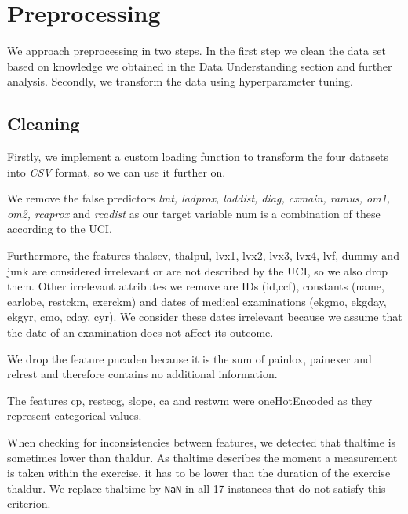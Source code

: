 \newpage
\section{Preprocessing} \label{sec:preprocessing}

We approach preprocessing in two steps. In the first step we clean the data set based on knowledge we obtained in the  Data Understanding section and further analysis. 
Secondly, we transform the data using hyperparameter tuning.

\subsection{Cleaning}
Firstly, we implement a custom loading function to transform the four datasets into \emph{CSV} format, so we can use it further on.

We remove the false predictors \emph{lmt, ladprox, laddist, diag, cxmain, ramus, om1, om2, rcaprox} and \emph{rcadist}  as our target variable num is a combination of these according to the UCI. %

Furthermore, the features thalsev, thalpul, lvx1, lvx2, lvx3, lvx4, lvf, dummy and junk are considered irrelevant or are not described by the UCI, so we also drop them. Other irrelevant attributes we remove are IDs (id,ccf), constants (name, earlobe, restckm, exerckm) and dates of medical examinations (ekgmo, ekgday, ekgyr, cmo, cday, cyr). We consider these dates irrelevant because we assume that the date of  an examination does not affect its outcome. 

We drop the feature pncaden because it is the sum of painlox, painexer and relrest and therefore contains no additional information. 

The features cp, restecg, slope, ca and restwm were oneHotEncoded as they represent categorical values.

When checking for inconsistencies between features, we detected that thaltime is sometimes lower than thaldur. As thaltime describes the moment a measurement is taken within the exercise, it has to be lower than the duration of the exercise thaldur. We replace thaltime by \texttt{NaN} in all 17 instances that do not satisfy this criterion. 

